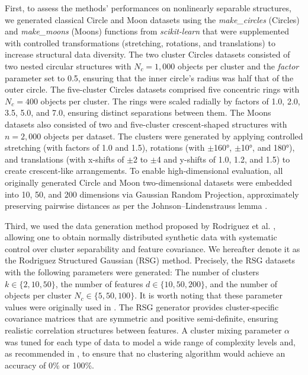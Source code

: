 \documentclass[preprint,12pt]{elsarticle}
\begin{document}
First, to assess the methods' performances on nonlinearly separable structures, we generated classical Circle and Moon datasets using the \textit{make\_circles} (Circles) and \textit{make\_moons} (Moons) functions from \textit{scikit-learn} that were supplemented with controlled transformations (stretching, rotations, and translations) to increase structural data diversity. The two cluster Circles datasets consisted of two nested circular structures with $N_c = 1,000$ objects per cluster and the \textit{factor} parameter set to 0.5, ensuring that the inner circle's radius was half that of the outer circle. The five-cluster Circles datasets comprised five concentric rings with $N_c = 400$ objects per cluster. The rings were scaled radially by factors of 1.0, 2.0, 3.5, 5.0, and 7.0, ensuring distinct separations between them. %
The Moons datasets also consisted of two and five-cluster crescent-shaped structures with $n = 2,000$ objects per dataset. The clusters were generated by applying controlled stretching (with factors of 1.0 and 1.5), rotations (with $\pm$160°, $\pm$10°, and 180°), and translations (with x-shifts of $\pm$2 to $\pm$4 and y-shifts of 1.0, 1.2, and 1.5) to create crescent-like arrangements. To enable high-dimensional evaluation, all originally generated Circle and Moon two-dimensional datasets were embedded into 10, 50, and 200 dimensions via Gaussian Random Projection, approximately preserving pairwise distances as per the Johnson–Lindenstrauss lemma \cite{frankl1988johnson}.


Third, we used the data generation method proposed by Rodriguez et al. \cite{rodriguez2019clustering}, allowing one to obtain normally distributed synthetic data with systematic control over cluster separability and feature covariance. We hereafter denote it as the Rodriguez Structured Gaussian (RSG) method. Precisely, the RSG datasets with the following parameters were generated: The number of clusters \( k \in \{2, 10, 50\} \), the number of features \( d \in \{10, 50, 200\} \), and the number of objects per cluster \( N_c \in \{5, 50, 100\} \). It is worth noting that these parameter values were originally used in \cite{rodriguez2019clustering}. The RSG generator provides cluster-specific covariance matrices that are symmetric and positive semi-definite, ensuring realistic correlation structures between features. A cluster mixing parameter \( \alpha \) was tuned for each type of data to model a wide range of %
complexity levels and, as recommended in \cite{rodriguez2019clustering}, to ensure that no clustering algorithm would achieve an accuracy of 0\% or 100\%.
\end{document}
